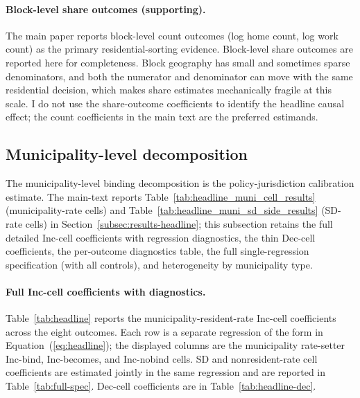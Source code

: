 \documentclass[12pt]{article}
\begin{document}
\paragraph{Block-level share outcomes (supporting).}
\label{sec:app-block-shares}
The main paper reports block-level count outcomes
(log home count, log work count) as the
primary residential-sorting evidence. Block-level share outcomes
are reported here for completeness. Block geography has small and
sometimes sparse denominators, and both the numerator and
denominator can move with the same residential decision, which
makes share estimates mechanically fragile at this scale. I do not
use the share-outcome coefficients to identify the headline causal
effect; the count coefficients in the main text are the preferred
estimands.



\subsection{Municipality-level decomposition}
\label{app:decomp-municipality}
\label{sec:app-municipality-detail}

The municipality-level binding decomposition is the
policy-jurisdiction calibration estimate. The main-text
reports Table~\ref{tab:headline_muni_cell_results} (municipality-rate cells)
and Table~\ref{tab:headline_muni_sd_side_results} (SD-rate cells) in
Section~\ref{subsec:results-headline}; this subsection retains the
full detailed Inc-cell coefficients with regression diagnostics,
the thin Dec-cell coefficients, the per-outcome diagnostics table,
the full single-regression specification (with all controls), and
heterogeneity by municipality type.

\paragraph{Full Inc-cell coefficients with diagnostics.}
\label{subsec:app-municipality-detail}

Table~\ref{tab:headline} reports the municipality-resident-rate Inc-cell coefficients
across the eight outcomes. Each row is a separate regression of the form
in Equation~(\ref{eq:headline}); the displayed columns are the municipality rate-setter
Inc-bind, Inc-becomes, and Inc-nobind cells. SD and nonresident-rate
cell coefficients are estimated jointly in the same regression and are
reported in Table~\ref{tab:full-spec}. Dec-cell coefficients are in
Table~\ref{tab:headline-dec}.
\end{document}
